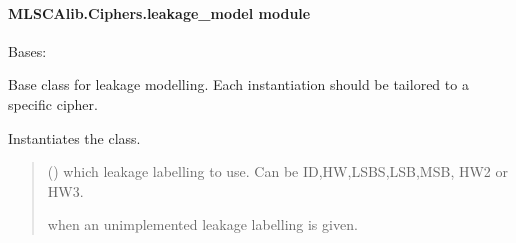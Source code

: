 \documentclass[letterpaper,10pt,english]{sphinxmanual}
\begin{document}
\paragraph{MLSCAlib.Ciphers.leakage\_model module}
\label{\detokenize{MLSCAlib.Ciphers:module-MLSCAlib.Ciphers.leakage_model}}\label{\detokenize{MLSCAlib.Ciphers:mlscalib-ciphers-leakage-model-module}}

\begin{fulllineitems}
\label{\detokenize{MLSCAlib.Ciphers:MLSCAlib.Ciphers.leakage_model.LeakageModel}}
\pysigstartsignatures
{}
\pysigstopsignatures
\sphinxAtStartPar
Bases: 

\sphinxAtStartPar
Base class for leakage modelling. Each instantiation should be tailored to a specific cipher.

\begin{fulllineitems}
\label{\detokenize{MLSCAlib.Ciphers:MLSCAlib.Ciphers.leakage_model.LeakageModel.__init__}}
\pysigstartsignatures
{}
\pysigstopsignatures
\sphinxAtStartPar
Instantiates the class.
\begin{quote}\begin{description}
\sphinxAtStartPar
{} () \textendash{} which leakage labelling to use. Can be ID,HW,LSBS,LSB,MSB, HW2 or HW3.

\sphinxAtStartPar
{} \textendash{} when an unimplemented leakage labelling is given.

\end{description}\end{quote}


\end{fulllineitems}
\end{fulllineitems}
\end{document}
